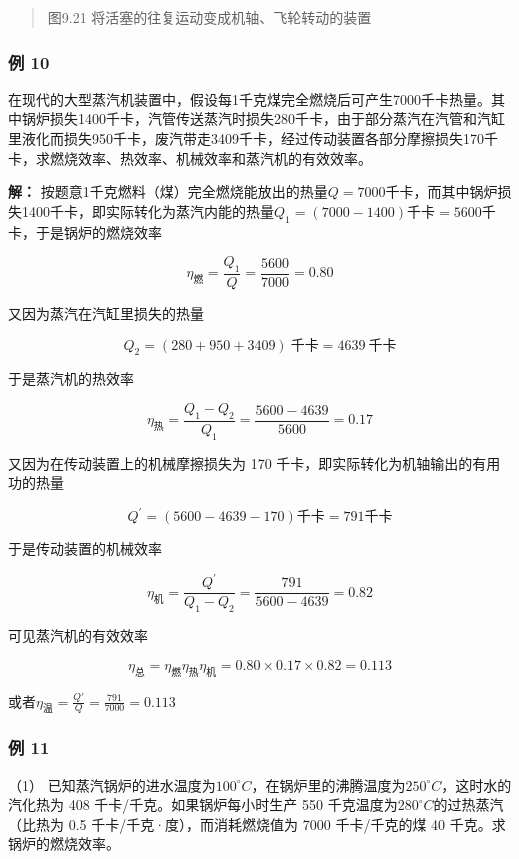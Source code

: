 \begin{quote}
图9.21 将活塞的往复运动变成机轴、飞轮转动的装置
\end{quote}

\subsubsection{例 10}\label{ux4f8b-10-2}

在现代的大型蒸汽机装置中，假设每1千克煤完全燃烧后可产生7000千卡热量。其中锅炉损失1400千卡，汽管传送蒸汽时损失280千卡，由于部分蒸汽在汽管和汽缸里液化而损失950千卡，废汽带走3409千卡，经过传动装置各部分摩擦损失170千卡，求燃烧效率、热效率、机械效率和蒸汽机的有效效率。

\textbf{解：}
按题意1千克燃料（煤）完全燃烧能放出的热量\(Q = 7000\)千卡，而其中锅炉损失1400千卡，即实际转化为蒸汽内能的热量\(Q_{1} = (7000 - 1400)\)千卡\(= 5600\)千卡，于是锅炉的燃烧效率

\[
\eta_ {\text{燃}} = \frac {Q _ {1}}{Q} = \frac {5600}{7000} = 0.80
\]

又因为蒸汽在汽缸里损失的热量

\[
Q_2=(280+950+3409)\ \text{千卡}=4639\ \text{千卡}
\]

于是蒸汽机的热效率

\[
\eta_{\text{热}}=\frac{Q_1-Q_2}{Q_1}=\frac{5600-4639}{5600}=0.17
\]

又因为在传动装置上的机械摩擦损失为 170
千卡，即实际转化为机轴输出的有用功的热量

\[
Q ^ {\prime} = (5600 - 4639 - 170) \text{千卡} = 791 \text{千卡}
\]

于是传动装置的机械效率

\[
\eta_{\text{机}}=\frac{Q^\prime}{Q_1-Q_2}=\frac{791}{5600-4639}=0.82
\]

可见蒸汽机的有效效率

\[
\eta_{\text{总}}=\eta_{\text{燃}}\eta_{\text{热}}\eta_{\text{机}}=0.80\times0.17\times0.82=0.113
\]

或者\(\eta_{\text{温}} = \frac{Q'}{Q} = \frac{791}{7000} = 0.113\)

\subsubsection{例 11}\label{ux4f8b-11-2}

（1）
已知蒸汽锅炉的进水温度为\(100^{\circ}C\)，在锅炉里的沸腾温度为\(250^{\circ}C\)，这时水的汽化热为
408 千卡/千克。如果锅炉每小时生产 550
千克温度为\(280^{\circ}C\)的过热蒸汽（比热为 0.5
千卡/千克·度），而消耗燃烧值为 7000 千卡/千克的煤 40
千克。求锅炉的燃烧效率。

